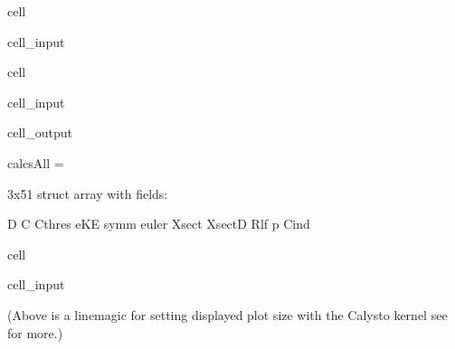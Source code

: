 \documentclass[letterpaper,10pt,english]{jupyterBook}
\begin{document}
\begin{sphinxuseclass}{cell}
\begin{sphinxVerbatimInput}
\begin{sphinxuseclass}{cell_input}
\end{sphinxuseclass}\end{sphinxVerbatimInput}

\end{sphinxuseclass}
\begin{sphinxuseclass}{cell}\begin{sphinxVerbatimInput}

\begin{sphinxuseclass}{cell_input}
\begin{sphinxVerbatim}[commandchars=\\\{\}]
\end{sphinxVerbatim}

\end{sphinxuseclass}\end{sphinxVerbatimInput}
\begin{sphinxVerbatimOutput}

\begin{sphinxuseclass}{cell_output}
\begin{sphinxVerbatim}[commandchars=\\\{\}]
calcsAll = 

  3x51 struct array with fields:

    D
    C
    Cthres
    eKE
    symm
    euler
    Xsect
    XsectD
    Rlf
    p
    Cind
\end{sphinxVerbatim}

\end{sphinxuseclass}\end{sphinxVerbatimOutput}

\end{sphinxuseclass}
\begin{sphinxuseclass}{cell}\begin{sphinxVerbatimInput}

\begin{sphinxuseclass}{cell_input}
\begin{sphinxVerbatim}[commandchars=\\\{\}]
\end{sphinxVerbatim}

\end{sphinxuseclass}\end{sphinxVerbatimInput}

\end{sphinxuseclass}
\sphinxAtStartPar
(Above is a line\sphinxhyphen{}magic for setting displayed plot size with the Calysto kernel \sphinxhyphen{} see  for more.)
\end{document}
